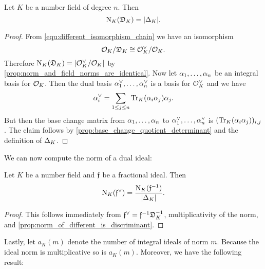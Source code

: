     \begin{proposition}\label{prop:norm_of_different_is_discriminant}
      Let $K$ be a number field of degree $n$. Then
      \[
        \operatorname{\mathrm{N}}_{K}(\mathfrak{D}_{K}) = |\Delta_{K}|.
      \]
    \end{proposition}
    \begin{proof}
      From \cref{equ:different_isomorphism_chain} we have an isomorphism
      \[
        \mathcal{O}_{K}/\mathfrak{D}_{K} \cong \mathcal{O}_{K}^{\vee}/\mathcal{O}_{K}.
      \]
      Therefore $\operatorname{\mathrm{N}}_{K}(\mathfrak{D}_{K}) = |\mathcal{O}_{K}^{\vee}/\mathcal{O}_{K}|$ by \cref{prop:norm_and_field_norms_are_identical}. Now let $\alpha_{1},\ldots,\alpha_{n}$ be an integral basis for $\mathcal{O}_{K}$. Then the dual basis $\alpha_{1}^{\vee},\ldots,\alpha_{n}^{\vee}$ is a basis for $\mathcal{O}_{K}^{\vee}$ and we have
      \[
        \alpha_{i}^{\vee} = \sum_{1 \le j \le n}\operatorname{\mathrm{Tr}}_{K}(\alpha_{i}\alpha_{j})\alpha_{j}.
      \]
      But then the base change matrix from $\alpha_{1},\ldots,\alpha_{n}$ to $\alpha_{1}^{\vee},\ldots,\alpha_{n}^{\vee}$ is $(\operatorname{\mathrm{Tr}}_{K}(\alpha_{i}\alpha_{j}))_{i,j}$. The claim follows by \cref{prop:base_change_quotient_determinant} and the definition of $\Delta_{K}$.
    \end{proof}

    We can now compute the norm of a dual ideal:

    \begin{corollary}\label{cor:norm_of_different}
      Let $K$ be a number field and $\mathfrak{f}$ be a fractional ideal. Then
      \[
        \operatorname{\mathrm{N}}_{K}(\mathfrak{f}^{\vee}) = \frac{\operatorname{\mathrm{N}}_{K}(\mathfrak{f}^{-1})}{|\Delta_{K}|}.
      \]
    \end{corollary}
    \begin{proof}
      This follows immediately from $\mathfrak{f}^{\vee} = \mathfrak{f}^{-1}\mathfrak{D}_{K}^{-1}$, multiplicativity of the norm, and \cref{prop:norm_of_different_is_discriminant}.
    \end{proof}

    Lastly, let $a_{K}(m)$ denote the number of integral ideals of norm $m$. Because the ideal norm is multiplicative so is $a_{K}(m)$. Moreover, we have the following result:

